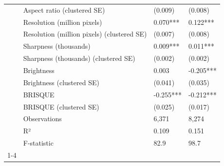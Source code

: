 \begin{tabular}{llll}
 & Aspect ratio (clustered SE) & (0.009) & (0.008) \\
 & Resolution (million pixels) & 0.070*** & 0.122*** \\
 & Resolution (million pixels) (clustered SE) & (0.007) & (0.008) \\
 & Sharpness (thousands) & 0.009*** & 0.011*** \\
 & Sharpness (thousands) (clustered SE) & (0.002) & (0.002) \\
 & Brightness & 0.003 & -0.205*** \\
 & Brightness (clustered SE) & (0.041) & (0.035) \\
 & BRISQUE & -0.255*** & -0.212*** \\
 & BRISQUE (clustered SE) & (0.025) & (0.017) \\
 & Observations & 6,371 & 8,274 \\
 & R² & 0.109 & 0.151 \\
 & F-statistic & 82.9 & 98.7 \\
\cline{1-4}
\bottomrule
\end{tabular}

